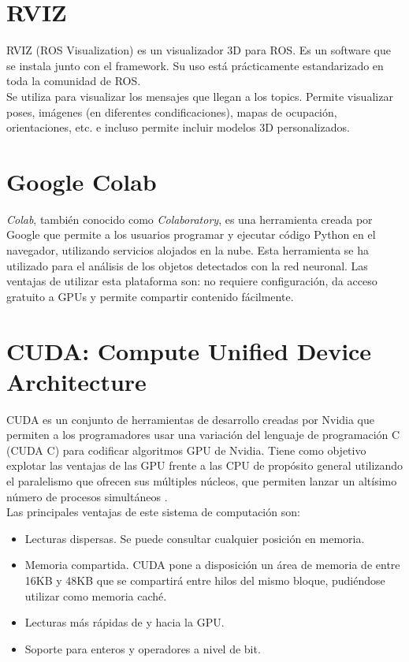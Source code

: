 \section{RVIZ}

RVIZ (ROS Visualization) es un visualizador 3D para ROS. Es un software que se instala junto con el framework. Su uso está prácticamente estandarizado en toda la comunidad de ROS.\\

Se utiliza para visualizar los mensajes que llegan a los topics. Permite visualizar poses, imágenes (en diferentes condificaciones),  mapas de ocupación, orientaciones, etc. e incluso permite incluir modelos 3D personalizados.\\

\section{Google Colab}

\textit{Colab}, también conocido como \textit{Colaboratory}, es una herramienta creada por Google que permite a los usuarios programar y ejecutar código Python en el navegador, utilizando servicios alojados en la nube. Esta herramienta se ha utilizado para el análisis de los objetos detectados con la red neuronal. Las ventajas de utilizar esta plataforma son: no requiere configuración, da acceso gratuito a GPUs y permite compartir contenido fácilmente.\\

\section{CUDA: Compute Unified Device Architecture} \label{apendA.cuda}

CUDA es un conjunto de herramientas de desarrollo creadas por Nvidia que permiten a los programadores usar una variación del lenguaje de programación C (CUDA C) para codificar algoritmos GPU de Nvidia. Tiene como objetivo explotar las ventajas de las GPU frente a las CPU de propósito general utilizando el paralelismo que ofrecen sus múltiples núcleos, que permiten lanzar un altísimo número de procesos simultáneos \cite{cuda}.\\

Las principales ventajas de este sistema de computación son:

\begin{itemize}

	\item Lecturas dispersas. Se puede consultar cualquier posición en memoria.
	\item Memoria compartida. CUDA pone a disposición un área de memoria de entre 16KB y 48KB que se compartirá entre hilos del mismo bloque, pudiéndose utilizar como memoria caché.
	\item Lecturas más rápidas de y hacia la GPU.
	\item Soporte para enteros y operadores a nivel de bit.

\end{itemize}

